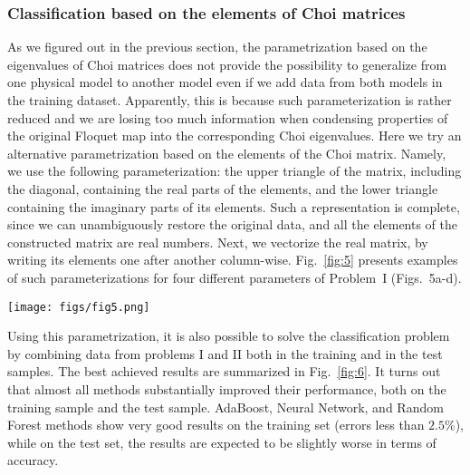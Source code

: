 \documentclass[%
 aip,
 floatfix,
 amsmath,amssymb,
 reprint,%
]{revtex4-1}
\begin{document}
\subsubsection{Classification based on the elements of Choi matrices}

As we figured out in the previous section, the parametrization based on the eigenvalues of Choi matrices does not provide the possibility to generalize from one physical model to another model even if we add data from both models in the training dataset. Apparently, this is because such parameterization is rather reduced and we are losing too much information when condensing  properties of the original Floquet map into the corresponding Choi eigenvalues. Here we try an alternative parametrization based on the elements of the Choi matrix. Namely, we use the following parameterization: the upper triangle of the matrix, including the diagonal, containing the real parts of the elements, and the lower triangle containing the imaginary parts of its elements. Such a representation is complete, since we can unambiguously restore the original data, and all the elements of the constructed matrix are real numbers. Next, we vectorize the real matrix, by writing its elements one after another column-wise. Fig.~\ref{fig:5} presents examples of such parameterizations for four different parameters of Problem~I (Figs.~5a-d). 

\begin{figure*}[t]
  \texttt{[image: figs/fig5.png]}
  \caption{Parametrization of the Choi matrix.
   The upper half of the matrix corresponds to the real part, the lower one -- to the imaginary part of the matrix. Center: Diagram of 'yes' (light blue) and 'no' (dark blue) answers to the question of the existence of Floquet-Lindbladian for the Problem~I. Four combinations of parameters are used (a, b, c, d). Their positions on the $(E,\omega)$ plane are indicated on the central diagram (red squares). } \label{fig:5}
\end{figure*}

Using this parametrization, it is also possible to solve the classification problem by combining data from problems I and II both in the training and in the test samples. The best achieved results are summarized in Fig.~\ref{fig:6}. It turns out that almost all methods substantially improved their performance, both on the training sample and the test sample. AdaBoost, Neural Network, and Random Forest methods show very good results on the training set (errors less than $2.5\%$), while on the test set, the results are expected to be slightly worse in terms of accuracy. 
\end{document}
